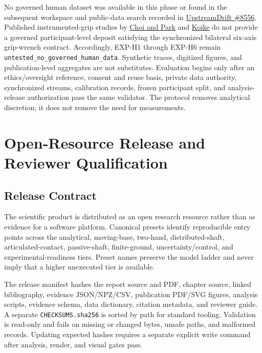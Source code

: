 \documentclass[
  letterpaper,
]{report}
\begin{document}
No governed human dataset was available in this phase or found in the
subsequent workspace and public-data search recorded in
\href{https://github.com/D-sorganization/UpstreamDrift/issues/8556}{UpstreamDrift
\#8556}. Published instrumented-grip studies by
\href{https://mdpi-res.com/d_attachment/sensors/sensors-20-03672/article_deploy/sensors-20-03672-v2.pdf}{Choi
and Park} and
\href{https://ojs.ub.uni-konstanz.de/cpa/article/download/6828/6125}{Koike}
do not provide a governed participant-level deposit satisfying the
synchronized bilateral six-axis grip-wrench contract. Accordingly,
EXP-H1 through EXP-H6 remain
\texttt{untested\_no\_governed\_human\_data}. Synthetic traces,
digitized figures, and publication-level aggregates are not substitutes.
Evaluation begins only after an ethics/oversight reference, consent and
reuse basis, private data authority, synchronized streams, calibration
records, frozen participant split, and analysis-release authorization
pass the same validator. The protocol removes analytical discretion; it
does not remove the need for measurements.

\chapter{Open-Resource Release and Reviewer
Qualification}\label{sec-open-release}

\section{Release Contract}\label{release-contract}

The scientific product is distributed as an open research resource
rather than as evidence for a software platform. Canonical presets
identify reproducible entry points across the analytical, moving-base,
two-hand, distributed-shaft, articulated-contact, passive-shaft,
finite-ground, uncertainty/control, and experimental-readiness tiers.
Preset names preserve the model ladder and never imply that a higher
unexecuted tier is available.

The release manifest hashes the report source and PDF, chapter source,
linked bibliography, evidence JSON/NPZ/CSV, publication PDF/SVG figures,
analysis scripts, evidence schema, data dictionary, citation metadata,
and reviewer guide. A separate \texttt{CHECKSUMS.sha256} is sorted by
path for standard tooling. Validation is read-only and fails on missing
or changed bytes, unsafe paths, and malformed records. Updating expected
hashes requires a separate explicit write command after analysis,
render, and visual gates pass.
\end{document}
